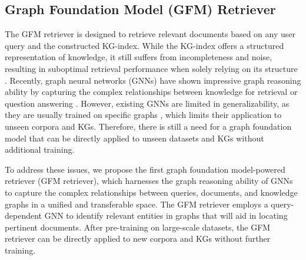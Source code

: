 \subsection{Graph Foundation Model (GFM) Retriever}\label{sec:gfm-retriever}
The GFM retriever is designed to retrieve relevant documents based on any user query and the constructed KG-index. While the KG-index offers a structured representation of knowledge, it still suffers from incompleteness and noise, resulting in suboptimal retrieval performance when solely relying on its structure \cite{gutiérrez2024hipporag}. Recently, graph neural networks (GNNs) \cite{wu2020comprehensive} have shown impressive graph reasoning ability by capturing the complex relationships between knowledge for retrieval or question answering \cite{mavromatis2024gnn,he2024g}. However, existing GNNs are limited in generalizability, as they are usually trained on specific graphs \cite{maoposition,liu2023towards}, which limits their application to unseen corpora and KGs. Therefore, there is still a need for a graph foundation model that can be directly applied to unseen datasets and KGs without additional training.

To address these issues, we propose the first graph foundation model-powered retriever (GFM retriever), which harnesses the graph reasoning ability of GNNs to capture the complex relationships between queries, documents, and knowledge graphs in a unified and transferable space. The GFM retriever employs a query-dependent GNN to identify relevant entities in graphs that will aid in locating pertinent documents. After pre-training on large-scale datasets, the GFM retriever can be directly applied to new corpora and KGs without further training.

